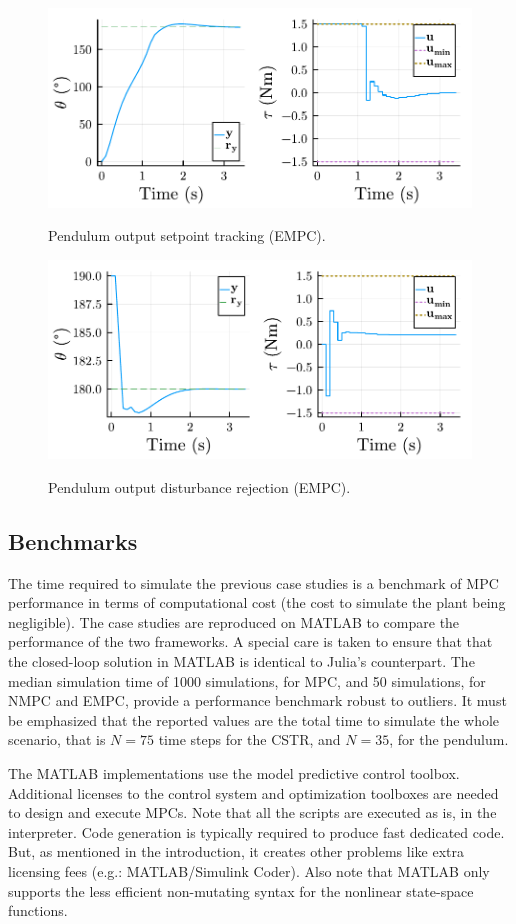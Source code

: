 \begin{figure}[ht]
    \centering
    \caption{Pendulum output setpoint tracking (EMPC).}
    \includegraphics[width=0.5\columnwidth]{fig/plot_EconomMPC1.pdf}
    \label{fig:plot_EconomMPC1}
\end{figure}
%
\begin{figure}[ht]
    \centering
    \caption{Pendulum output disturbance rejection (EMPC).}
    \includegraphics[width=0.5\columnwidth]{fig/plot_EconomMPC2.pdf}
    \label{fig:plot_EconomMPC2}
\end{figure}

\subsection{Benchmarks}
\label{sec:benchmarks}

The time required to simulate the previous case studies is a benchmark of MPC performance in terms of computational cost (the cost to simulate the plant being negligible). The case studies are reproduced on MATLAB to compare the performance of the two frameworks. A special care is taken to ensure that that the closed-loop solution in MATLAB is identical to Julia’s counterpart. The median simulation time of 1000 simulations, for MPC, and 50 simulations, for NMPC and EMPC, provide a performance benchmark robust to outliers. It must be emphasized that the reported values are the total time to simulate the whole scenario, that is $N=75$ time steps for the CSTR, and $N=35$, for the pendulum.

The MATLAB implementations use the model predictive control toolbox. Additional licenses to the control system and optimization toolboxes are needed to design and execute MPCs. Note that all the scripts are executed as is, in the interpreter. Code generation is typically required to produce fast dedicated code. But, as mentioned in the introduction, it creates other problems like extra licensing fees (e.g.: MATLAB/Simulink Coder). Also note that MATLAB only supports the less efficient non-mutating syntax for the nonlinear state-space functions.

